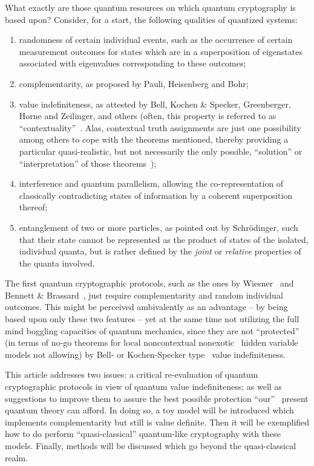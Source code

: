 \documentclass[%
 preprint,
 showpacs,
 showkeys,
 preprintnumbers,
 amsmath,amssymb,
 aps,
 pra,
  longbibliography,
 ]{revtex4-1}
\begin{document}
What exactly are those quantum resources on which quantum cryptography is based upon?
Consider, for a start,  the following qualities of quantized systems:
\renewcommand{\labelenumi}{(\roman{enumi})}
\begin{enumerate}
\item
randomness of certain individual events,
such as the occurrence of certain measurement outcomes
for states which are in a  superposition of eigenstates
associated with eigenvalues corresponding to these outcomes;
\item
complementarity, as proposed by Pauli, Heisenberg and Bohr;
\item
value indefiniteness, as attested by Bell, Kochen \& Specker, Greenberger, Horne and Zeilinger, and others
(often, this property is referred to as ``contextuality''~\cite{bohr-1949,bell-66,redhead}.
Alas, contextual truth assignments
are just one possibility among others to cope with the theorems mentioned,
thereby providing a particular quasi-realistic, but not necessarily the only possible, ``solution'' or ``interpretation'' of those theorems~\cite{svozil-2008-ql});
\item
interference and quantum parallelism, allowing the co-representation of classically contradicting states of information
by a coherent superposition thereof;
\item
entanglement of two or more particles,
as pointed out by Schr\"odinger, such that their state cannot be represented
as the product of states of the isolated, individual quanta,
but is rather defined by the {\em joint} or {\em relative} properties of the quanta involved.
\end{enumerate}

The first quantum cryptographic protocols, such as the ones by Wiesner~\cite{wiesner} and
Bennett \& Brassard~\cite{benn-84,benn-92},
just require complementarity and random individual outcomes.
This might be perceived ambivalently as an advantage -- by being based upon only these two features --
yet at the same time not utilizing the full mind boggling capacities of quantum mechanics, since they are not ``protected''
(in terms of no-go theorems for local noncontextual nonexotic~\cite{pitowsky-82,meyer:99}
hidden variable models not allowing)
by Bell- or Kochen-Specker type~\cite{specker-60,kochen1,ZirlSchl-65,Alda,Alda2,kamber64,kamber65,mermin-93}
value indefiniteness.

This article addresses two issues: a critical re-evaluation
of quantum cryptographic protocols in view
of quantum value indefiniteness;
as well as suggestions to improve them to assure the best possible protection
``our''~\cite[p.~866]{born-26-1} present quantum theory can afford.
In doing so, a toy model will be introduced which implements complementarity but still
is value definite.
Then it will be exemplified how to do perform ``quasi-classical'' quantum-like cryptography
with these models.
Finally, methods will be discussed which go beyond the quasi-classical realm.
\end{document}
